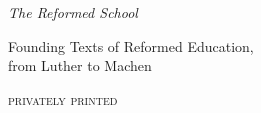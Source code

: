 \begin{center}
\vspace*{1.6in}
{\Huge\itshape The Reformed School\par}
\vspace{0.5in}
{\large Founding Texts of Reformed Education,\\ from Luther to Machen\par}
\vspace{2.2in}
{\normalsize\scshape\MakeLowercase{Privately printed}\par}
{\small \the\year\par}
\end{center}
